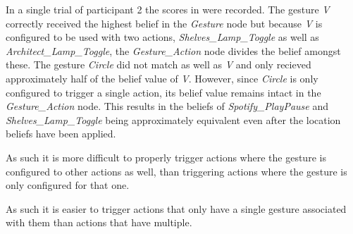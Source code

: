 In a single trial of participant 2 the scores in  were recorded.
The gesture \emph{V} correctly received the highest belief in the \emph{Gesture} node but because \emph{V} is configured to be used with two actions, \emph{Shelves\_Lamp\_Toggle} as well as \emph{Architect\_Lamp\_Toggle}, the \emph{Gesture\_Action} node divides the belief amongst these.
The  gesture \emph{Circle} did not match as well as \emph{V} and only recieved approximately half of the belief value of \emph{V}.
However, since \emph{Circle} is only configured to trigger a single action, its belief value remains intact in the \emph{Gesture\_Action} node.
This results in the beliefs of \emph{Spotify\_PlayPause} and \emph{Shelves\_Lamp\_Toggle} being approximately equivalent even after the location beliefs have been applied.

As such it is more difficult to properly trigger actions where the gesture is configured to other actions as well, than triggering actions where the gesture is only configured for that one.

As such it is easier to trigger actions that only have a single gesture associated with them than actions that have multiple.

